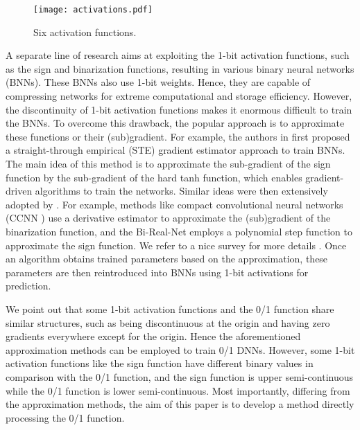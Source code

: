 \documentclass[journal]{IEEEtran}
\begin{document}
\begin{figure*}[!th]
\centering
\texttt{[image: activations.pdf]}
\caption{Six activation functions.}\vspace{-5mm}
\label{figureactivation}
\end{figure*}

{  A separate line of research aims at exploiting the 1-bit
activation functions, such as the sign and binarization  functions,  resulting in various binary neural networks (BNNs). These BNNs also use 1-bit weights. Hence,  they are capable of compressing networks for extreme computational and storage efficiency. However, the discontinuity of 1-bit activation functions makes it enormous difficult to train the BNNs. To overcome this drawback, the popular approach is to approximate these functions or their (sub)gradient. For example,   the authors in \cite{Hinton2012} first proposed a straight-through empirical (STE) gradient estimator approach to train BNNs. The main idea of this method is to approximate the sub-gradient of the sign function by the sub-gradient of the hard tanh function, which enables gradient-driven algorithms to train the networks.  Similar ideas were then extensively adopted by \cite{zhong2012sensitivity,courbariaux2015,Tang2017,Alizadeh2018,Xu-Cheung2019,Gu-Zhang2019,Martinez-Yang2020, Martinez2020, Bulat2021,Ye-wang2021,Zhang-wang2021,jiang-wang2022,Li-Wang2022,Wang-He2022}. For example, methods like compact convolutional neural networks (CCNN \cite{Xu-Cheung2019}) use a derivative estimator to approximate the (sub)gradient of the binarization function, and the Bi-Real-Net \cite{Martinez-Yang2020} employs a polynomial step function to approximate the sign function. We refer to a nice survey for more details \cite{Yuan2021}. Once an algorithm obtains trained parameters based on the approximation, these parameters are then reintroduced into BNNs using 1-bit activations for prediction.}

 

{We point out that some 1-bit activation functions and the 0/1 function share similar structures, such as being discontinuous at the origin and having zero gradients everywhere except for the origin. Hence the aforementioned approximation methods can be employed to train 0/1 DNNs.   However, some 1-bit activation functions like the sign function have different binary values in comparison with the 0/1 function,  and the sign function is upper semi-continuous while the 0/1 function is lower semi-continuous. Most importantly, differing from the approximation methods, the aim of this paper is to develop a method directly processing the 0/1 function.}
\end{document}

